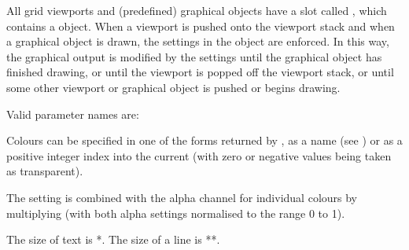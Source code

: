 \begin{Details}\relax
All grid viewports and (predefined) graphical objects have a slot
called , which contains a  object.  When
a viewport is pushed onto the viewport stack and when a graphical object
is drawn, the settings in the  object are enforced.
In this way, the graphical output is modified by the 
settings until the graphical object has finished drawing, or until the
viewport is popped off the viewport stack, or until some other
viewport or graphical object is pushed or begins drawing.

Valid parameter names are:


Colours can be specified in one of the forms returned by
, as a name (see ) or as a
positive integer index into the current  (with zero or
negative values being taken as transparent).

The  setting is combined with the alpha channel for
individual colours by multiplying (with both alpha settings
normalised to the range 0 to 1).

The size of text is *.  The size of a line
is **.


\end{Details}
